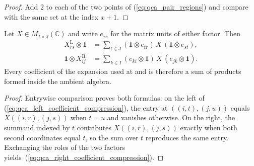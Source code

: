 \begin{proof}\leanok
    Add $2$ to each of the two points of (\ref{eq:qca_pair_regions}) and
    compare with the same set at the index $x+1$.
\end{proof}

\begin{lemma}
    \label{lem:qca_support_coefficient_compression}
    \leanok
    Let $X\in M_{I\times J}(\mathbb C)$ and write $e_{rs}$ for the matrix
    units of either factor.  Then
    \begin{align}
        X^{\mathrm L}_{rs}\otimes\mathbf 1
         & =\sum_{t\in J}
        (\mathbf 1\otimes e_{tr})\,X\,(\mathbf 1\otimes e_{st}),
        \label{eq:qca_left_coefficient_compression} \\
        \mathbf 1\otimes X^{\mathrm R}_{ij}
         & =\sum_{k\in I}
        (e_{ki}\otimes\mathbf 1)\,X\,(e_{jk}\otimes\mathbf 1).
        \label{eq:qca_right_coefficient_compression}
    \end{align}
    Every coefficient of the expansion used at
    \cite[lines~1188--1191]{Gross2012IndexTheory} and
    \cite[lines~1137--1169]{SchumacherWerner2004QCA} is therefore a sum of
    products formed inside the ambient algebra.
\end{lemma}

\begin{proof}\leanok
    Entrywise comparison proves both formulas: on the left of
    (\ref{eq:qca_left_coefficient_compression}), the entry at
    $((i,t),(j,u))$ equals $X((i,r),(j,s))$ when $t=u$ and vanishes
    otherwise.  On the right, the summand indexed by $t$ contributes
    $X((i,r),(j,s))$ exactly when both second coordinates equal $t$, so the
    sum over $t$ reproduces the same entry.  Exchanging the roles of the two factors yields~(\ref{eq:qca_right_coefficient_compression}).
\end{proof}

